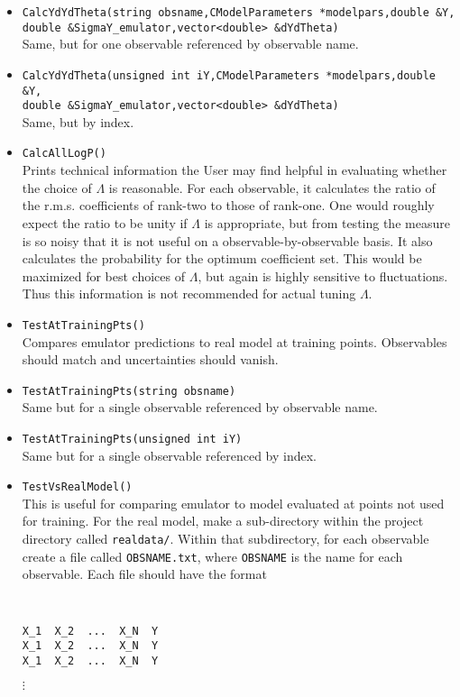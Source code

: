 \documentclass[UserManual.tex]{subfiles}
\begin{document}
\begin{itemize}
\item {\tt CalcYdYdTheta(string obsname,CModelParameters *modelpars,double \&Y,\\double \&SigmaY\_emulator,vector<double> \&dYdTheta)}\\
Same, but for one observable referenced by observable name.
\item {\tt CalcYdYdTheta(unsigned int iY,CModelParameters *modelpars,double \&Y,\\double \&SigmaY\_emulator,vector<double> \&dYdTheta)}\\
Same, but by index.
\item {\tt CalcAllLogP()}\\
Prints technical information the User may find helpful in evaluating whether the choice of $\Lambda$ is reasonable. For each observable, it calculates the ratio of the r.m.s. coefficients of rank-two to those of rank-one. One would roughly expect the ratio to be unity if $\Lambda$ is appropriate, but from testing the measure is so noisy that it is not useful on a observable-by-observable basis. It also calculates the probability for the optimum coefficient set. This would be maximized for best choices of $\Lambda$, but again is highly sensitive to fluctuations. Thus this information is not recommended for actual tuning $\Lambda$. 
\item {\tt TestAtTrainingPts()}\\
Compares emulator predictions to real model at training points. Observables should match and uncertainties should vanish.
\item {\tt TestAtTrainingPts(string obsname)}\\
Same but for a single observable referenced by observable name.
\item {\tt TestAtTrainingPts(unsigned int iY)}\\
Same but for a single observable referenced by index.
\item {\tt TestVsRealModel()}\\
This is useful for comparing emulator to model evaluated at points not used for training. For the real model, make a sub-directory within the project directory called {\tt realdata/}. Within that subdirectory, for each observable create a file called {\tt OBSNAME.txt}, where {\tt OBSNAME} is the name for each observable. Each file should have the format
{\tt
\begin{verbatim}
X_1  X_2  ...  X_N  Y
X_1  X_2  ...  X_N  Y
X_1  X_2  ...  X_N  Y
\end{verbatim}}
\hspace*{36pt}$\vdots$


\end{itemize}
\end{document}
